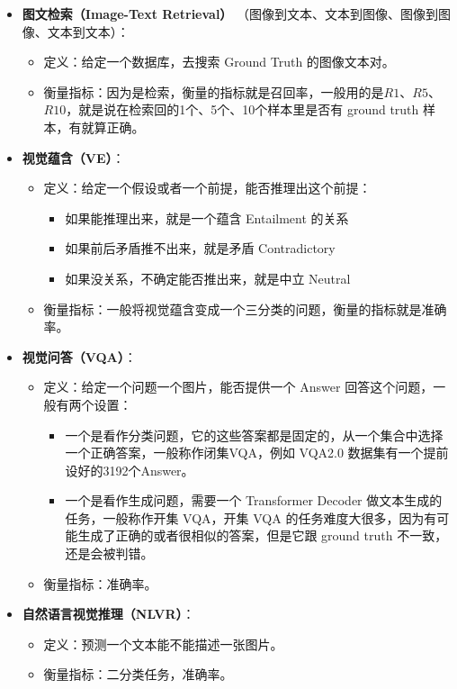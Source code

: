 \documentclass[zihao=false,fontset=windows]{ctexart}
\begin{document}
\par\vspace{1.15em}\par\vspace{0.28em}
\begin{itemize}
\item \textbf{图文检索（Image-Text Retrieval）}
（图像到文本、文本到图像、图像到图像、文本到文本）：\par
\begin{itemize}
\item 定义：给定一个数据库，去搜索 Ground Truth 的图像文本对。
\item 衡量指标：因为是检索，衡量的指标就是召回率，一般用的是$R1$、$R5$、$R10$，就是说在检索回的1个、5个、10个样本里是否有 ground truth 样本，有就算正确。
\end{itemize}
\item \textbf{视觉蕴含（VE）}：
\begin{itemize}
\item 定义：给定一个假设或者一个前提，能否推理出这个前提：
\begin{itemize}
\item 如果能推理出来，就是一个蕴含 Entailment\textbf{ }的关系
\item 如果前后矛盾推不出来，就是矛盾 Contradictory
\item 如果没关系，不确定能否推出来，就是中立 Neutral
\end{itemize}
\item 衡量指标：一般将视觉蕴含变成一个三分类的问题，衡量的指标就是准确率。
\end{itemize}
\item \textbf{视觉问答（VQA）}：
\begin{itemize}
\item 定义：给定一个问题一个图片，能否提供一个 Answer 回答这个问题，一般有两个设置：
\begin{itemize}
\item 一个是看作分类问题，它的这些答案都是固定的，从一个集合中选择一个正确答案，一般称作闭集VQA，例如 VQA2.0 数据集有一个提前设好的3192个Answer。
\item 一个是看作生成问题，需要一个 Transformer Decoder 做文本生成的任务，一般称作开集 VQA，开集 VQA 的任务难度大很多，因为有可能生成了正确的或者很相似的答案，但是它跟 ground truth 不一致，还是会被判错。
\end{itemize}
\item 衡量指标：准确率。
\end{itemize}
\item \textbf{自然语言视觉推理（NLVR）}：
\begin{itemize}
\item 定义：预测一个文本能不能描述一张图片。
\item 衡量指标：二分类任务，准确率。
\end{itemize}
\end{itemize}
\end{document}
